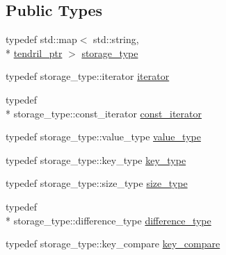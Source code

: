 \subsection*{Public Types}
\begin{DoxyCompactItemize}
\item 
typedef std\-::map$<$ std\-::string, \\*
\hyperlink{namespaceecto_a84fb5f6130275382e5cbeb5fdececa78}{tendril\-\_\-ptr} $>$ \hyperlink{classecto_1_1tendrils_a3647503829f1b29de220584d265c63fb}{storage\-\_\-type}
\item 
typedef storage\-\_\-type\-::iterator \hyperlink{classecto_1_1tendrils_a6f0b7bd6e3a03f047351303630b889e0}{iterator}
\item 
typedef \\*
storage\-\_\-type\-::const\-\_\-iterator \hyperlink{classecto_1_1tendrils_a86df9983555ca4ebdae8b1d36aa4bbd8}{const\-\_\-iterator}
\item 
typedef storage\-\_\-type\-::value\-\_\-type \hyperlink{classecto_1_1tendrils_a736870868e76890e198448924cecdd4f}{value\-\_\-type}
\item 
typedef storage\-\_\-type\-::key\-\_\-type \hyperlink{classecto_1_1tendrils_aa6165c6ab72d93cd56796ea81e450245}{key\-\_\-type}
\item 
typedef storage\-\_\-type\-::size\-\_\-type \hyperlink{classecto_1_1tendrils_af3726f822a4fd60a1095bba31f1926ef}{size\-\_\-type}
\item 
typedef \\*
storage\-\_\-type\-::difference\-\_\-type \hyperlink{classecto_1_1tendrils_a919b9a4666ad641148b6a432a1fd08fb}{difference\-\_\-type}
\item 
typedef storage\-\_\-type\-::key\-\_\-compare \hyperlink{classecto_1_1tendrils_aa347bebda44153437e8554a25bed9e6b}{key\-\_\-compare}
\end{DoxyCompactItemize}
